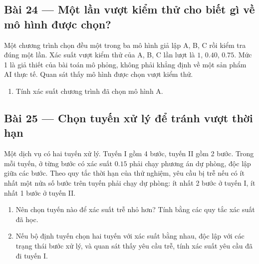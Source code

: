 \documentclass[11pt,a4paper]{article}
\begin{document}
\noindent\begin{minipage}{\linewidth}
\subsection*{Bài 24 --- Một lần vượt kiểm thử cho biết gì về mô hình được chọn?}

Một chương trình chọn đều một trong ba mô hình giả lập A, B, C rồi kiểm tra đúng một lần. Xác suất vượt kiểm thử của A, B, C lần lượt là \(1\), \(0.40\), \(0.75\). Mức 1 là giả thiết của bài toán mô phỏng, không phải khẳng định về một sản phẩm AI thực tế. Quan sát thấy mô hình được chọn vượt kiểm thử.

\begin{enumerate}[label=\alph*)]
\item Tính xác suất chương trình đã chọn mô hình A.
\end{enumerate}

\end{minipage}\par

\par\medskip

\noindent\begin{minipage}{\linewidth}
\subsection*{Bài 25 --- Chọn tuyến xử lý để tránh vượt thời hạn}

Một dịch vụ có hai tuyến xử lý. Tuyến I gồm 4 bước, tuyến II gồm 2 bước. Trong mỗi tuyến, ở từng bước có xác suất \(0.15\) phải chạy phương án dự phòng, độc lập giữa các bước. Theo quy tắc thời hạn của thử nghiệm, yêu cầu bị trễ nếu có ít nhất một nửa số bước trên tuyến phải chạy dự phòng: ít nhất 2 bước ở tuyến I, ít nhất 1 bước ở tuyến II.

\begin{enumerate}[label=\alph*)]
\item Nên chọn tuyến nào để xác suất trễ nhỏ hơn? Tính bằng các quy tắc xác suất đã học.
\item Nếu bộ định tuyến chọn hai tuyến với xác suất bằng nhau, độc lập với các trạng thái bước xử lý, và quan sát thấy yêu cầu trễ, tính xác suất yêu cầu đã đi tuyến I.
\end{enumerate}

\end{minipage}\par
\end{document}
